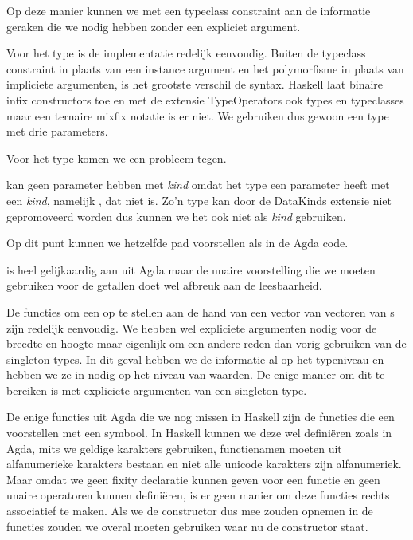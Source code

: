 
Op deze manier kunnen we met een typeclass constraint aan de informatie geraken
die we nodig hebben zonder een expliciet argument.

Voor het  type is de implementatie redelijk eenvoudig. Buiten de
typeclass constraint in plaats van een instance argument en het polymorfisme in
plaats van impliciete argumenten, is het grootste verschil de syntax. Haskell
laat binaire infix constructors toe en met de extensie TypeOperators
\cite{typeops} ook types en typeclasses maar een ternaire mixfix notatie is er
niet. We gebruiken dus gewoon een type met drie parameters.


Voor het type  komen we een probleem tegen.


 kan geen parameter hebben met \emph{kind}  omdat het
type  een parameter heeft met een \emph{kind}, namelijk
, dat niet \ihask{*} is. Zo'n type kan door de DataKinds extensie
niet gepromoveerd worden dus kunnen we het ook niet als \emph{kind} gebruiken.

Op dit punt kunnen we hetzelfde pad voorstellen als in de Agda code.


 is heel gelijkaardig aan  uit Agda maar de unaire
voorstelling die we moeten gebruiken voor de getallen doet wel afbreuk aan de
leesbaarheid.

De functies om een  op te stellen aan de hand van een vector van
vectoren van s zijn redelijk eenvoudig. We hebben wel
expliciete argumenten nodig voor de breedte en hoogte maar eigenlijk om een
andere reden dan vorig gebruiken van de singleton types. In dit geval hebben we
de informatie al op het typeniveau en hebben we ze in 
nodig op het niveau van waarden. De enige manier om dit te bereiken is met
expliciete argumenten van een singleton type.


De enige functies uit Agda die we nog missen in Haskell zijn de functies die
een  voorstellen met een symbool. In Haskell kunnen we deze wel
definiëren zoals in Agda, mits we geldige karakters gebruiken, functienamen
moeten uit alfanumerieke karakters bestaan en niet alle unicode karakters zijn
alfanumeriek. Maar omdat we geen fixity declaratie kunnen geven voor een
functie en geen unaire operatoren kunnen definiëren, is er geen manier om deze
functies rechts associatief te maken. Als we de constructor \ihask{(:>)} dus
mee zouden opnemen in de functies zouden we overal \ihask{\$} moeten gebruiken
waar nu de constructor staat.

